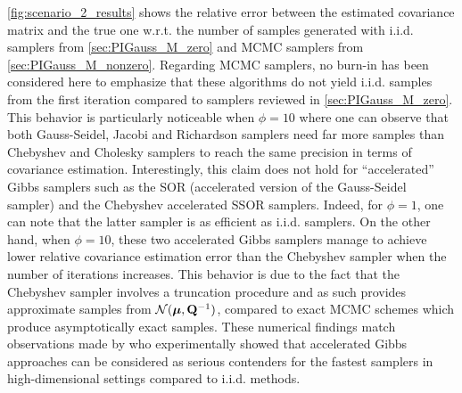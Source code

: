 \documentclass[nohypdvips,onefignum,onetabnum]{siamart171218}
\begin{document}
\cref{fig:scenario_2_results} shows the relative error between the estimated covariance matrix and the true one w.r.t. the number of samples generated with i.i.d. samplers from \cref{sec:PIGauss_M_zero} and MCMC samplers from \cref{sec:PIGauss_M_nonzero}.
Regarding MCMC samplers, no burn-in has been considered here to emphasize that these algorithms do not yield i.i.d. samples from the first iteration compared to samplers reviewed in \cref{sec:PIGauss_M_zero}.
This behavior is particularly noticeable when $\phi = 10$ where one can observe that both Gauss-Seidel, Jacobi and Richardson samplers need far more samples than Chebyshev and Cholesky samplers to reach the same precision in terms of covariance estimation.
Interestingly, this claim does not hold for ``accelerated'' Gibbs samplers such as the SOR (accelerated version of the Gauss-Seidel sampler) and the Chebyshev accelerated SSOR samplers.
Indeed, for $\phi=1$, one can note that the latter sampler is as efficient as i.i.d. samplers.
On the other hand, when $\phi=10$, these two accelerated Gibbs samplers manage to achieve lower relative covariance estimation error than the Chebyshev sampler when the number of iterations increases.
This behavior is due to the fact that the Chebyshev sampler involves a truncation procedure and as such provides approximate samples from $\mathcal{N}(\boldsymbol{\mu},\mathbf{Q}^{-1})$, compared to exact MCMC schemes which produce asymptotically exact samples.
These numerical findings match observations made by \cite{Fox2017} who experimentally showed that accelerated Gibbs approaches can be considered as serious contenders for the fastest samplers in high-dimensional settings compared to i.i.d. methods.
\end{document}
